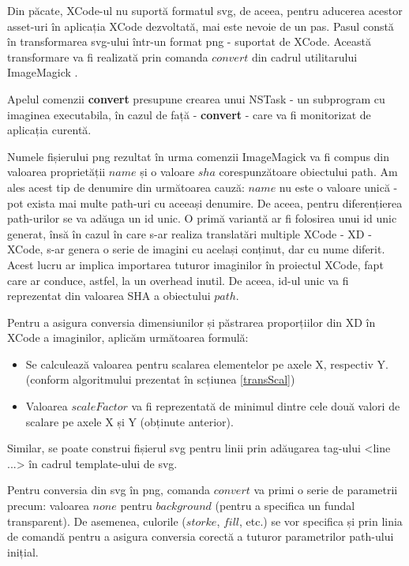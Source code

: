 Din păcate, XCode-ul nu suportă formatul svg, de aceea, pentru aducerea acestor asset-uri în aplicația XCode dezvoltată, mai este nevoie de un pas. Pasul constă în transformarea svg-ului într-un format png - suportat de XCode. Această transformare va fi realizată prin comanda $convert$ din cadrul utilitarului ImageMagick \cite{imageMagick}. 

Apelul comenzii \textbf{convert} presupune crearea unui NSTask - un subprogram cu imaginea executabila, în cazul de față - \textbf{convert} - care va fi monitorizat de aplicația curentă. 

Numele fișierului png rezultat în urma comenzii ImageMagick va fi compus din valoarea proprietății $name$ și o valoare $sha$ corespunzătoare obiectului path. Am ales acest tip de denumire din următoarea cauză: $name$ nu este o valoare unică - pot exista mai multe path-uri cu aceeași denumire. De aceea, pentru diferențierea path-urilor se va adăuga un id unic. O primă variantă ar fi folosirea unui id unic generat, însă în cazul în care s-ar realiza translatări multiple XCode - XD - XCode, s-ar genera o serie de imagini cu același conținut, dar cu nume diferit. Acest lucru ar implica importarea tuturor imaginilor în proiectul XCode, fapt care ar conduce, astfel, la un overhead inutil. De aceea, id-ul unic va fi reprezentat din valoarea SHA a obiectului $path$.

Pentru a asigura conversia dimensiunilor și păstrarea proporțiilor din XD în XCode a imaginilor, aplicăm următoarea formulă:

\begin{itemize}  
\item Se calculează valoarea pentru scalarea elementelor pe axele X, respectiv Y. (conform algoritmului prezentat în scțiunea \ref{transScal})
\item Valoarea $scaleFactor$ va fi reprezentată de minimul dintre cele două valori de scalare pe axele X și Y (obținute anterior).
\end{itemize}

Similar, se poate construi fișierul svg pentru linii prin adăugarea tag-ului <line ...> în cadrul template-ului de svg.

Pentru conversia din svg în png, comanda $convert$ va primi o serie de parametrii precum: valoarea $none$ pentru $background$ (pentru a specifica un fundal transparent). De asemenea, culorile ($storke$, $fill$, etc.) se vor specifica și prin linia de comandă pentru a asigura conversia corectă a tuturor parametrilor path-ului inițial.

